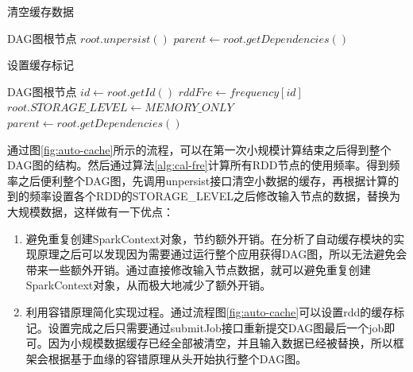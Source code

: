 \begin{algorithm}  
    \caption{清空缓存数据}  
    \begin{algorithmic}[1] %
        \Require DAG图根节点
            \State $root.unpersist()$
            \State $parent \gets root.getDependencies()$
                \State {}
            \EndFor
        \EndFunction
    \end{algorithmic}
    \label{alg:clean-cache}
\end{algorithm}


\begin{algorithm}  
    \caption{设置缓存标记}  
    \begin{algorithmic}[1] %
        \Require DAG图根节点
            \State $id \gets root.getId()$
            \State $rddFre \gets frequency[id]$
                \State $root.STORAGE\_LEVEL \gets MEMORY\_ONLY$
            \EndIf
            \State $parent \gets root.getDependencies()$
                \State {}
            \EndFor
        \EndFunction
    \end{algorithmic}
    \label{alg:set-cache}
\end{algorithm}

通过图\ref{fig:auto-cache}所示的流程，可以在第一次小规模计算结束之后得到整个DAG图的结构。然后通过算法\ref{alg:cal-fre}计算所有RDD节点的使用频率。得到频率之后便利整个DAG图，先调用unpersist接口清空小数据的缓存，再根据计算的到的频率设置各个RDD的STORAGE\_LEVEL之后修改输入节点的数据，替换为大规模数据，这样做有一下优点：

\begin{enumerate}
    \item 避免重复创建SparkContext对象，节约额外开销。在分析了自动缓存模块的实现原理之后可以发现因为需要通过运行整个应用获得DAG图，所以无法避免会带来一些额外开销。通过直接修改输入节点数据，就可以避免重复创建SparkContext对象，从而极大地减少了额外开销。
    \item 利用容错原理简化实现过程。通过流程图\ref{fig:auto-cache}可以设置rdd的缓存标记。设置完成之后只需要通过submitJob接口重新提交DAG图最后一个job即可。因为小规模数据缓存已经全部被清空，并且输入数据已经被替换，所以框架会根据基于血缘的容错原理从头开始执行整个DAG图。
\end{enumerate}

